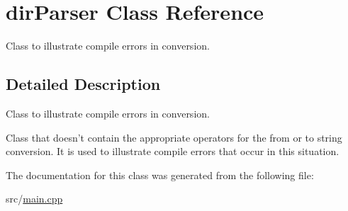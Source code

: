 \hypertarget{classdir_parser}{\section{dir\-Parser \-Class \-Reference}
\label{classdir_parser}
}


\-Class to illustrate compile errors in conversion.  




\subsection{\-Detailed \-Description}
\-Class to illustrate compile errors in conversion. 

\-Class that doesn't contain the appropriate operators for the from or to string conversion. \-It is used to illustrate compile errors that occur in this situation. 

\-The documentation for this class was generated from the following file\-:\begin{DoxyCompactItemize}
\item 
src/\hyperlink{main_8cpp}{main.\-cpp}\end{DoxyCompactItemize}
